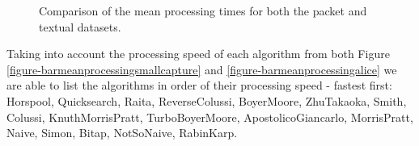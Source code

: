 \documentclass[11pt]{article}
\begin{document}
\begin{figure}[t]
    \centering
    
    \caption{Comparison of the mean processing times for both the packet and textual datasets.}
\end{figure}

Taking into account the processing speed of each algorithm from both Figure \ref{figure-barmeanprocessingsmallcapture} and \ref{figure-barmeanprocessingalice} we are able to list the algorithms in order of their processing speed - fastest first: Horspool, Quicksearch, Raita, ReverseColussi, BoyerMoore, ZhuTakaoka, Smith, Colussi, KnuthMorrisPratt, TurboBoyerMoore, ApostolicoGiancarlo, MorrisPratt, Naive, Simon, Bitap, NotSoNaive, RabinKarp. 
\end{document}
